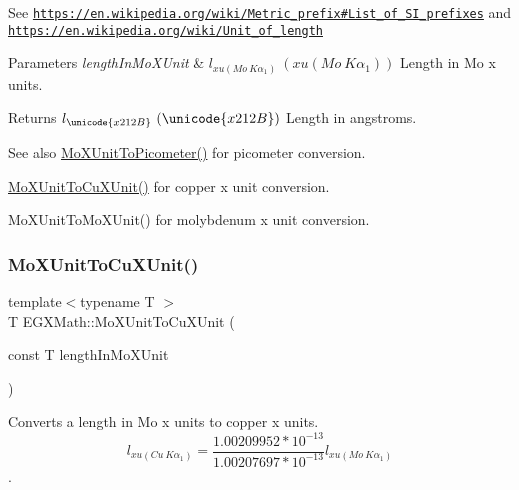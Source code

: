 See \href{https://en.wikipedia.org/wiki/Metric_prefix#List_of_SI_prefixes}{\tt https\+://en.\+wikipedia.\+org/wiki/\+Metric\+\_\+prefix\#\+List\+\_\+of\+\_\+\+S\+I\+\_\+prefixes} and \href{https://en.wikipedia.org/wiki/Unit_of_length}{\tt https\+://en.\+wikipedia.\+org/wiki/\+Unit\+\_\+of\+\_\+length} 
\begin{DoxyParams}{Parameters}
{\em length\+In\+Mo\+X\+Unit} & $ l_{xu(Mo\ K\alpha_1)}\ (xu(Mo\ K\alpha_1))$ Length in Mo x units. \\
\hline
\end{DoxyParams}
\begin{DoxyReturn}{Returns}
$ l_{\unicode{x212B}}\ (\unicode{x212B})$ Length in angstroms. 
\end{DoxyReturn}
\begin{DoxySeeAlso}{See also}
\mbox{\hyperlink{group___e_g_x_math-_conversions-_length_conversions-_non-_s_i-_mo_x_unit-_s_i_ga9b06995f2d8ddd611999e65539f0896c}{Mo\+X\+Unit\+To\+Picometer()}} for picometer conversion. 

\mbox{\hyperlink{group___e_g_x_math-_conversions-_length_conversions-_non-_s_i-_mo_x_unit-_non-_s_i_ga15685a2e91cbe4f0ae403ed1b4c9b9b4}{Mo\+X\+Unit\+To\+Cu\+X\+Unit()}} for copper x unit conversion. 

Mo\+X\+Unit\+To\+Mo\+X\+Unit() for molybdenum x unit conversion. 
\end{DoxySeeAlso}
\mbox{\label{group___e_g_x_math-_conversions-_length_conversions-_non-_s_i-_mo_x_unit-_non-_s_i_ga15685a2e91cbe4f0ae403ed1b4c9b9b4}} 
\subsubsection{\texorpdfstring{Mo\+X\+Unit\+To\+Cu\+X\+Unit()}{MoXUnitToCuXUnit()}}
{\footnotesize\ttfamily template$<$typename T $>$ \\
T E\+G\+X\+Math\+::\+Mo\+X\+Unit\+To\+Cu\+X\+Unit (\begin{DoxyParamCaption}\item[{const T}]{length\+In\+Mo\+X\+Unit }\end{DoxyParamCaption})}



Converts a length in Mo x units to copper x units. \[ l_{xu(Cu\ K\alpha_1)}= \frac{1.00209952*10^{-13}}{1.00207697*10^{-13}} l_{xu(Mo\ K\alpha_1)}\]. 


